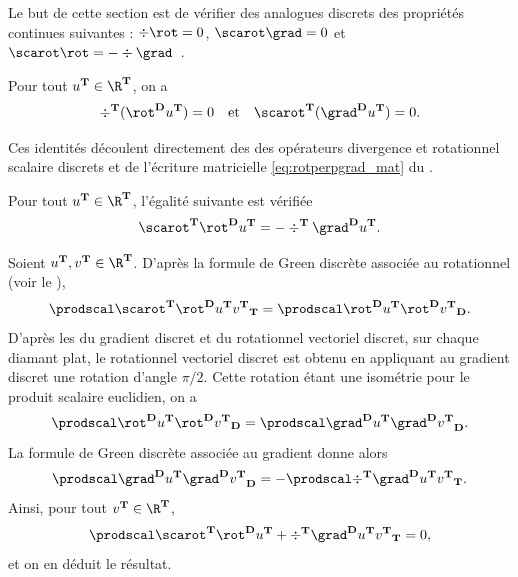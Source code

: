 Le but de cette section est de vérifier des analogues discrets des propriétés continues suivantes : $\div \rot = 0$, $\scarot \grad = 0$ et $\scarot \rot = - \div \grad$\ .

\begin{prop} \label{prop:compo1}
Pour tout $u^\ensddfvplat \in \R^\ensddfvplat$, on a
\[
\div^\ensddfvplat (\rot^\ensdiamantplat u^\ensddfvplat) = 0
\quad
\text{et}
\quad
\scarot^\ensddfvplat (\grad^\ensdiamantplat u^\ensddfvplat) = 0. 
\]
\end{prop}
Ces identités découlent directement des  des opérateurs divergence et rotationnel scalaire discrets et de l'écriture matricielle \ref{eq:rotperpgrad_mat} du .

\begin{prop} \label{prop:compo2}
Pour tout $u^\ensddfvplat \in \R^\ensddfvplat$, l'égalité suivante est vérifiée
\[
\scarot^\ensddfvplat \rot^\ensdiamantplat u^\ensddfvplat = - \div^\ensddfvplat \grad^\ensdiamantplat u^\ensddfvplat.
\]
\end{prop}

\begin{demo}
Soient $u^\ensddfvplat, v^\ensddfvplat \in \R^\ensddfvplat$. D'après la formule de Green discrète associée au rotationnel (voir le ),
\[
\prodscalddfv{\scarot^\ensddfvplat \rot^\ensdiamantplat u^\ensddfvplat}{v^\ensddfvplat}
=
\prodscalD{\rot^\ensdiamantplat u^\ensddfvplat}{\rot^\ensdiamantplat v^\ensddfvplat}.
\]
D'après les  du gradient discret et du rotationnel vectoriel discret, sur chaque diamant plat, le rotationnel vectoriel discret est obtenu en appliquant au gradient discret une rotation d'angle $\pi/2$. Cette rotation étant une isométrie pour le produit scalaire euclidien, on a
\[
\prodscalD{\rot^\ensdiamantplat u^\ensddfvplat}{\rot^\ensdiamantplat v^\ensddfvplat}
=
\prodscalD{\grad^\ensdiamantplat u^\ensddfvplat}{\grad^\ensdiamantplat v^\ensddfvplat}.
\]
La formule de Green discrète associée au gradient donne alors
\[
\prodscalD{\grad^\ensdiamantplat u^\ensddfvplat}{\grad^\ensdiamantplat v^\ensddfvplat}
=
- \prodscalddfv{\div^\ensddfvplat \grad^\ensdiamantplat u^\ensddfvplat}{v^\ensddfvplat}.
\]
Ainsi, pour tout $v^\ensddfvplat \in \R^\ensddfvplat$,
\[
\prodscalddfv{\scarot^\ensddfvplat \rot^\ensdiamantplat u^\ensddfvplat + \div^\ensddfvplat \grad^\ensdiamantplat u^\ensddfvplat}{v^\ensddfvplat} = 0,
\]
et on en déduit le résultat.
\end{demo}

